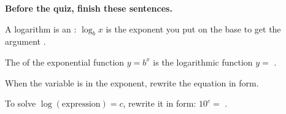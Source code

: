 \vspace{8pt}
\textbf{Before the quiz, finish these sentences.}

A logarithm is an \blank[3cm]: $\log_b x$ is the exponent you put on the base \blank[1.2cm] to get the argument \blank[1.2cm].

The \blank[2.2cm] of the exponential function $y=b^x$ is the logarithmic function $y=$ \blank[2.4cm].

When the variable is in the exponent, rewrite the equation in \blank[3.4cm] form.

To solve $\log(\text{expression})=c$, rewrite it in \blank[4cm] form: $10^{c}=$ \blank[3cm].



